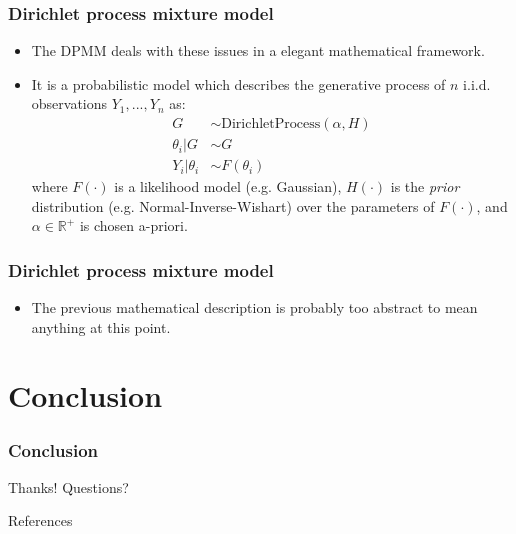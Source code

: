 \documentclass{beamer}
\newcommand{\R}{\ensuremath{\mathbb{R}}}
\begin{document}
\begin{frame}
\frametitle{Dirichlet process mixture model}
\begin{itemize}[<+->]
  \item The DPMM deals with these issues in a elegant mathematical framework.
  \item It is a probabilistic model which describes the generative process
    of $n$ i.i.d. observations $Y_1, ..., Y_n$ as:
    \begin{align*}
      G &\sim \text{DirichletProcess}(\alpha, H) \\
      \theta_i | G &\sim G \\
      Y_i | \theta_i &\sim F(\theta_i)
    \end{align*}
    where $F(\cdot)$ is a likelihood model (e.g. Gaussian),  $H(\cdot)$ is the
    \emph{prior} distribution (e.g. Normal-Inverse-Wishart) over the parameters
    of $F(\cdot)$, and $\alpha \in \R^{+}$ is chosen a-priori.
\end{itemize}
\end{frame}


\begin{frame}
\frametitle{Dirichlet process mixture model}
\begin{itemize}[<+->]
  \item The previous mathematical description is probably too abstract to mean
    anything at this point.

\end{itemize}
\end{frame}



\section{Conclusion}
\begin{frame}
\frametitle{Conclusion}
Thanks! Questions?
\cite{chaudhuri11}
\end{frame}

\begin{frame}[allowframebreaks]{References}
\small


\end{frame}
\end{document}
